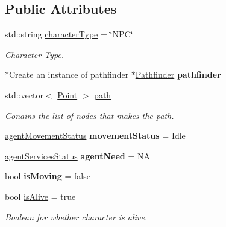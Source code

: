 \subsection*{Public Attributes}
\begin{DoxyCompactItemize}
\item 
\mbox{\label{class_agent_a88eff9b9a41c730d03e1b14dd730fe72}} 
std\+::string \hyperlink{class_agent_a88eff9b9a41c730d03e1b14dd730fe72}{character\+Type} = \char`\"{}N\+PC\char`\"{}
\begin{DoxyCompactList}\small\item\em Character Type. \end{DoxyCompactList}\item 
\mbox{\label{class_agent_ae4e1c9d4a042a0aa761392c45bed3a2b}} 
$\ast$Create an instance of pathfinder $\ast$\hyperlink{class_pathfinder}{Pathfinder} {\bfseries pathfinder}
\item 
\mbox{\label{class_agent_ad221d98ce80b1f5ddd06182a825e50c5}} 
std\+::vector$<$ \hyperlink{class_point}{Point} $>$ \hyperlink{class_agent_ad221d98ce80b1f5ddd06182a825e50c5}{path}
\begin{DoxyCompactList}\small\item\em Conains the list of nodes that makes the path. \end{DoxyCompactList}\item 
\mbox{\label{class_agent_a2d0b3cc1362a8bbbddda3476573f6733}} 
\hyperlink{class_agent_af0b2c4596f7df623b5912509a09d0449}{agent\+Movement\+Status} {\bfseries movement\+Status} = Idle
\item 
\mbox{\label{class_agent_a38888c7ca94b440873b5ea3b2c01e52f}} 
\hyperlink{class_agent_ac7c6344403211868f101f7903fa9cb82}{agent\+Services\+Status} {\bfseries agent\+Need} = NA
\item 
\mbox{\label{class_agent_aab5675be1775cd18ff37e3e1870d51be}} 
bool {\bfseries is\+Moving} = false
\item 
\mbox{\label{class_agent_ac256f4583cc7f7c581ee1f7250f05f4f}} 
bool \hyperlink{class_agent_ac256f4583cc7f7c581ee1f7250f05f4f}{is\+Alive} = true
\begin{DoxyCompactList}\small\item\em Boolean for whether character is alive. \end{DoxyCompactList}\item 

\end{DoxyCompactItemize}
